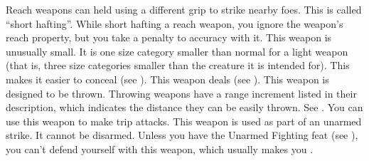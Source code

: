         Reach weapons can held using a different grip to strike nearby foes. This is called ``short hafting''. While short hafting a reach weapon, you ignore the weapon's reach property, but you take a  penalty to accuracy with it.
         This weapon is unusually small. It is one size category smaller than normal for a light weapon (that is, three size categories smaller than the creature it is intended for). This makes it easier to conceal (see ).
         This weapon deals  (see ).
         This weapon is designed to be thrown. Throwing weapons have a range increment listed in their description, which indicates the distance they can be easily thrown. See .
         You can use this weapon to make trip attacks.  %
         This weapon is used as part of an unarmed strike. It cannot be disarmed. Unless you have the Unarmed Fighting feat (see ), you can't defend yourself with this weapon, which usually makes you .

